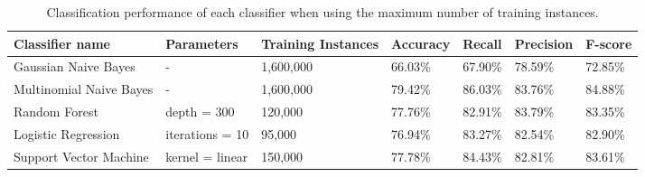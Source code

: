 \begin{table}
\centering
\caption{Classification performance of each classifier when using the maximum number of training instances.}
\begin{tabular}{ |p{3cm}||p{3cm}|p{2cm}|p{1.5cm}|p{1.5cm}|p{1.5cm}|p{1.5cm}| }
 \hline
 Classifier name &          Parameters &Training Instances &    Accuracy &      Recall &     Precision& F-score \\
 \hline
 Gaussian Naive Bayes       &-&            1,600,000&   66.03\%&        67.90\%&       78.59\%& 72.85\%\\
  \hline
 Multinomial Naive Bayes  &-&             1,600,000&      79.42\%&        86.03\%&       83.76\%& 84.88\%\\
  \hline
 Random Forest              &depth = 300&            120,000& 77.76\%&  82.91\%&    83.79\%& 83.35\%\\
  \hline
 Logistic Regression        &iterations = 10&   95,000&    76.94\%&        83.27\%&   82.54\%& 82.90\%\\
  \hline
 Support Vector Machine     &kernel = linear&            150,000&   77.78\%&        84.43\%&    82.81\%& 83.61\%\\
 \hline
\end{tabular}
\label{tab:evaluations_max}
\end{table}


